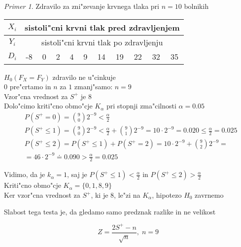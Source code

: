 \documentclass[a4paper,12pt]{article}
\theoremstyle{definition}
\theoremstyle{remark}
\newtheorem*{ex}{Primer}
\begin{document}
\begin{ex}
    Zdravilo za zni"zevanje krvnega tlaka pri $n = 10$ bolnikih

    \begin{center}
        \begin{tabular}{c | c c c c c c c c c c}
            $X_i$ & \multicolumn{10}{c}{sistoli"cni krvni tlak pred zdravljenjem} \\
            \hline
            $Y_i$ & \multicolumn{10}{c}{sistoli"cni krvni tlak po zdravljenju} \\
            \hline
            $D_i$ & -8 & 0 & 2 & 4 & 9 & 14 & 19 & 22 & 32 & 35    
        \end{tabular}
    \end{center}

    $H_0(F_X = F_Y)$ zdravilo ne u"cinkuje \\
    $0$ pre"crtamo in $n$ za $1$ zmanj"samo: $n = 9$ \\
    Vzor"cna vrednost za $S^+$ je $8$ \\
    Dolo"cimo kriti"cno obmo"cje $K_{\alpha}$ pri stopnji zma"cilnosti $\alpha = 0.05$ \\


    \begin{align*}
        &P(S^+ = 0) = \binom{9}{0} 2^{-9} < \frac{\alpha}{2} \\
        &P(S^+ \leq 1) = \binom{9}{0} 2^{-9} < \frac{\alpha}{2} + \binom{9}{1} 2^{-9} = 10 \cdot 2^{-9} = 0.020
            \leq \frac{\alpha}{2} = 0.025 \\
        &P(S^+ \leq 2) = P(S^+ \leq 1) + P(S^+ = 2) = 10 \cdot 2^{-9} + \binom{9}{2} 2^{-9} = \\
        &= 46 \cdot 2^{-9} \doteq 0.090 > \frac{\alpha}{2} = 0.025
    \end{align*}

    Vidimo, da je $k_{\alpha} = 1$, saj je $P(S^+ \leq 1) < \frac{\alpha}{2}$ in $P(S^+ \leq 2) > \frac{\alpha}{2}$ \\
    Kriti"cno obmo"cje $K_{\alpha} = \{0, 1, 8, 9\}$ \\
    Ker vzor"cna vrednost za $S^+$, ki je $8$, le"zi na $K_{\alpha}$, hipotezo $H_0$ zavrnemo
\end{ex}

Slabost tega testa je, da gledamo samo predznak razlike in ne velikost

\begin{equation*}
    Z = \frac{2S^+ - n}{\sqrt{n}}, \; n = 9
\end{equation*}
\end{document}
